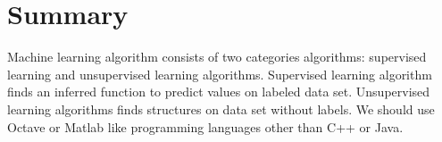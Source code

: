 \documentclass{article}
\begin{document}
\section{Summary}
Machine learning algorithm consists of two categories algorithms: supervised learning and unsupervised learning algorithms. Supervised learning algorithm finds an inferred function to predict values on labeled data set. Unsupervised learning algorithms finds structures on data set without labels. We should use Octave or Matlab like programming languages other than C++ or Java.
\end{document}
